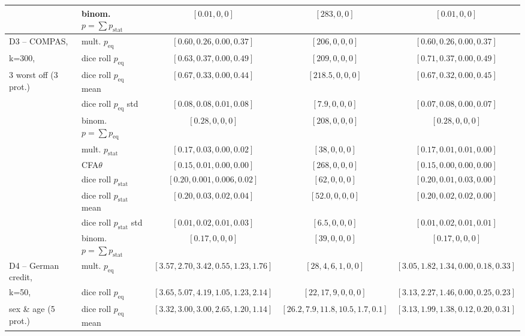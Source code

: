 \begin{table}[t!]
{\begin{tabular}{llccc}
							& binom. \algoFAIR $p = \sum p_{\text{stat}}$	& $[0.01,0,0]$		& $[283,0,0]$	& $[0.01,0,0]$ \\													
			\midrule
			\midrule
			D3 -- COMPAS, 		& mult. \algoFAIR  $p_{\text{eq}}$ 	& $[0.60, 0.26, 0.00, 0.37]$ 	& $[206, 0, 0, 0]$ 		& $[0.60, 0.26, 0.00, 0.37]$ \\
			k=300,				& dice roll $p_{\text{eq}}$ 	& $[0.63, 0.37, 0.00, 0.49]$ & $[209, 0, 0, 0]$ 	& $[0.71, 0.37, 0.00, 0.49]$ \\
			3 worst off (3 prot.)	& dice roll $p_{\text{eq}}$ mean	& $[0.67, 0.33, 0.00, 0.44]$ & $[218.5, 0, 0, 0]$ 	& $[0.67, 0.32, 0.00, 0.45]$ \\
								& dice roll $p_{\text{eq}}$ std	& $[0.08, 0.08, 0.01, 0.08]$ & $[7.9, 0, 0, 0]$ 	& $[0.07, 0.08, 0.00, 0.07]$ \\
								& binom. \algoFAIR $p = \sum p_{\text{eq}}$	& $[0.28,0,0, 0]$		& $[208,0,0, 0]$		& $[0.28,0,0, 0]$  \\
									\cline{2-5}
								& mult. \algoFAIR  $p_{\text{stat}}$ 	& $[0.17, 0.03, 0.00, 0.02]$ & $[38, 0, 0, 0]$ 				& $[0.17, 0.01,0.01, 0.00] $  \\
							 	& CFA$\theta$ 					& $[0.15, 0.01, 0.00, 0.00] $ & $[268, 0, 0, 0]$ 	& $[0.15, 0.00, 0.00, 0.00]$   \\
								& dice roll $p_{\text{stat}}$ 	& $[0.20, 0.001, 0.006, 0.02]$ & $[62, 0, 0, 0]$ 		& $[0.20, 0.01, 0.03, 0.00]$ \\
								& dice roll $p_{\text{stat}}$ mean	& $[0.20, 0.03, 0.02, 0.04]$ & $[52.0, 0, 0, 0]$ 		& $[0.20, 0.02, 0.02, 0.00]$ \\
								& dice roll $p_{\text{stat}}$ std	& $[0.01, 0.02, 0.01, 0.03]$ & $[6.5, 0, 0, 0]$ 		& $[0.01, 0.02, 0.01, 0.01]$ \\
								& binom. \algoFAIR $p = \sum p_{\text{stat}}$	& $[0.17,0,0, 0]$		& $[39,0,0, 0]$		& $[0.17,0,0, 0]$  \\												
			\midrule
			\midrule
			D4 -- German credit, 	& mult. \algoFAIR $p_{\text{eq}}$ 	&  $[3.57, 2.70, 3.42, 0.55, 1.23, 1.76]$ 	& $[28, 4, 6, 1, 0, 0]$ 	& $[3.05, 1.82, 1.34, 0.00, 0.18, 0.33]$ \\
			k=50,					& dice roll $p_{\text{eq}}$ 	& $[3.65, 5.07, 4.19, 1.05, 1.23, 2.14]$ & $[22, 17, 9, 0, 0, 0]$ 	& $[3.13, 2.27, 1.46, 0.00, 0.25, 0.23]$ \\
			sex \& age (5 prot.)	& dice roll $p_{\text{eq}}$ mean	& $[3.32, 3.00, 3.00, 2.65, 1.20, 1.14]$ & $[26.2, 7.9, 11.8, 10.5, 1.7, 0.1]$ 	& $[3.13, 1.99, 1.38, 0.12, 0.20, 0.31]$ \\

\end{tabular}}
\end{table}

